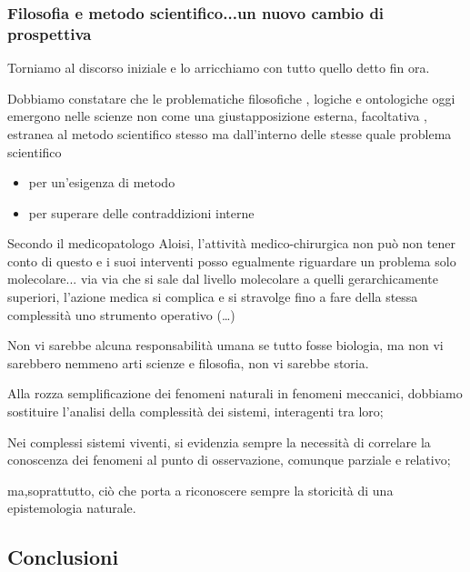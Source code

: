   \subsubsection{Filosofia e metodo scientifico...un nuovo cambio di prospettiva}

  Torniamo al discorso iniziale e lo arricchiamo con tutto quello detto
  fin ora.

  Dobbiamo constatare che le problematiche filosofiche , logiche e
  ontologiche oggi emergono nelle scienze non come una giustapposizione
  esterna, facoltativa , estranea al metodo scientifico stesso ma
  dall'interno delle stesse quale problema scientifico
\begin{itemize}
\item per un'esigenza di metodo
\item per superare delle contraddizioni interne
\end{itemize}

  Secondo il medicopatologo Aloisi, l'attività medico-chirurgica non può
  non tener conto di questo e i suoi interventi posso egualmente
  riguardare un problema solo molecolare... via via che si sale dal
  livello molecolare a quelli gerarchicamente superiori, l'azione medica
  si complica e si stravolge fino a fare della stessa complessità uno
  strumento operativo (\ldots{})

  Non vi sarebbe alcuna responsabilità umana se tutto fosse biologia, ma
  non vi sarebbero nemmeno arti scienze e filosofia, non vi sarebbe
  storia.

  Alla rozza semplificazione dei fenomeni naturali in fenomeni
  meccanici, dobbiamo sostituire l'analisi della complessità dei
  sistemi, interagenti tra loro;

  Nei complessi sistemi viventi, si evidenzia sempre la necessità di
  correlare la conoscenza dei fenomeni al punto di osservazione,
  comunque parziale e relativo;

  ma,soprattutto, ciò che porta a riconoscere sempre la storicità di una
  epistemologia naturale.

  \subsection{Conclusioni}


